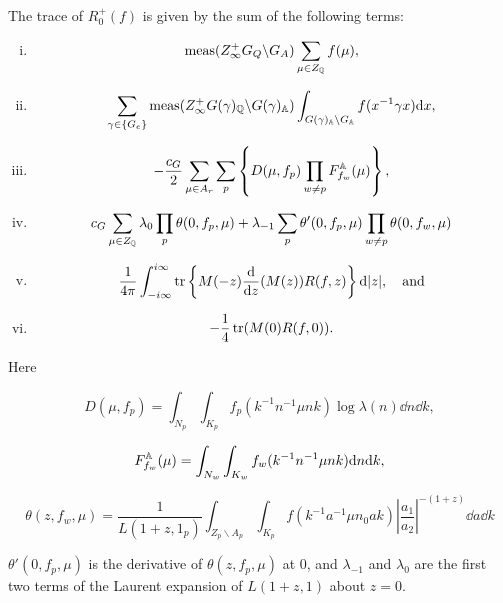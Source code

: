 \begin{theorem}\label{thm:9.22}

The trace of $R_0^{+}(f)$ is given by the sum of the following terms:

\begin{enumerate}[(i)]

\item

\[
\operatorname{meas}(Z_\infty^{+}G_Q \backslash G_A)\sum_{\mu \in Z_{\mathbb{Q}}} f(\mu),
\]

\item

\[
\sum_{\gamma \in \{G_e\}}\operatorname{meas}(Z_\infty^{+}G(\gamma)_{\mathbb{Q}} \backslash G(\gamma)_{\mathbb{A}})\int_{G(\gamma)_{\mathbb{A}} \backslash G_{\mathbb{A}}} f(x^{-1}\gamma x)\mathrm{d} x,
\]

\item

\[
-\frac{c_G}{2}\sum_{\mu \in A_r}\sum_p\left\{D(\mu, f_p)\prod_{w \neq p}F_{f_w}^{\mathbb{A}}(\mu)\right\},
\]

\item

\[
c_G\sum_{\mu \in Z_{\mathbb{Q}}}\lambda_0\prod_p\theta(0, f_p, \mu) + \lambda_{-1}\sum_p\theta'(0, f_p, \mu)\prod_{w \neq p}\theta(0, f_w, \mu)
\]

\item

\[
\frac{1}{4\pi}\int_{-i\infty}^{i\infty}\operatorname{tr}\left\{M(-z)\frac{\mathrm{d}}{\mathrm{d} z}(M(z))R(f, z)\right\}\mathrm{d}|z|, \quad \text{and}
\]

\item

\[
-\frac{1}{4}\operatorname{tr}(M(0)R(f, 0)).
\]

\end{enumerate}

Here

\[
D(\mu, f_p) = \int_{N_p}\int_{K_p} f_p(k^{-1}n^{-1}\mu nk)\log\lambda(n)\dd n\dd k,
\]

\[
F_{f_w}^{\mathbb{A}}(\mu) = \int_{N_w}\int_{K_w} f_w(k^{-1}n^{-1}\mu nk)\mathrm{d} n\mathrm{d} k,
\]

\[
\theta(z, f_w, \mu) = \frac{1}{L(1 + z, 1_p)}\int_{Z_p \backslash A_p}\int_{K_p} f(k^{-1}a^{-1}\mu n_0ak)\left|\frac{a_1}{a_2}\right|^{-(1+z)}\dd a\dd k
\]

$\theta'(0, f_p, \mu)$ is the derivative of $\theta(z, f_p, \mu)$ at 0, and $\lambda_{-1}$ and $\lambda_0$ are the first two terms of the Laurent expansion of $L(1 + z, 1)$ about $z = 0$.

\end{theorem}

